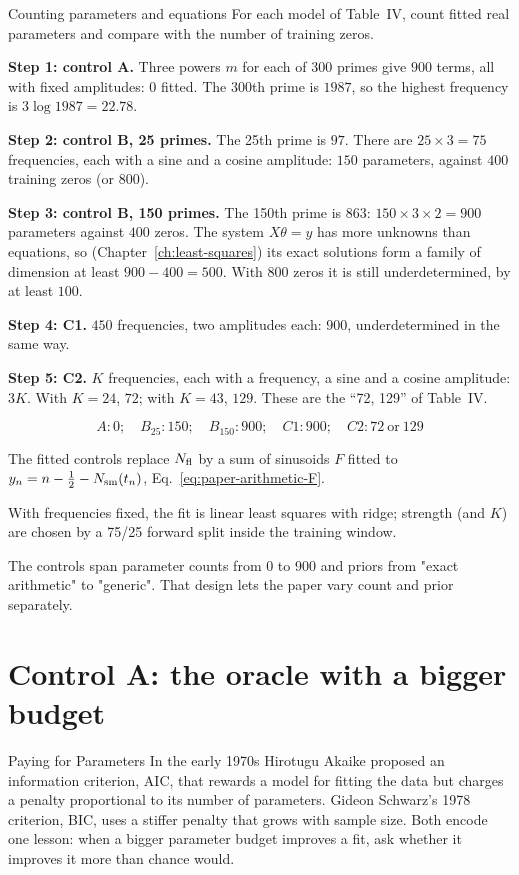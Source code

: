 \begin{sample}{Counting parameters and equations}
For each model of Table~IV, count fitted real parameters and compare with the number of training zeros.

\textbf{Step 1: control A.} Three powers $m$ for each of 300 primes give $900$ terms, all with fixed amplitudes: $0$ fitted. The 300th prime is $1987$, so the highest frequency is $3\log1987=22.78$.

\textbf{Step 2: control B, 25 primes.} The 25th prime is $97$. There are $25\times3=75$ frequencies, each with a sine and a cosine amplitude: $150$ parameters, against $400$ training zeros (or $800$).

\textbf{Step 3: control B, 150 primes.} The 150th prime is $863$: $150\times3\times2=900$ parameters against $400$ zeros. The system $X\theta=y$ has more unknowns than equations, so (Chapter~\ref{ch:least-squares}) its exact solutions form a family of dimension at least $900-400=500$. With $800$ zeros it is still underdetermined, by at least $100$.

\textbf{Step 4: C1.} $450$ frequencies, two amplitudes each: $900$, underdetermined in the same way.

\textbf{Step 5: C2.} $K$ frequencies, each with a frequency, a sine and a cosine amplitude: $3K$. With $K=24$, $72$; with $K=43$, $129$. These are the ``72, 129'' of Table~IV.

\[
\boxed{A:0;\quad B_{25}:150;\quad B_{150}:900;\quad C1:900;\quad C2:72\ \text{or}\ 129}
\]
\end{sample}

\begin{keyideas}
\item The fitted controls replace $N_{\mathrm{fl}}$ by a sum of sinusoids $F$ fitted to $y_n=n-\tfrac12-N_{\mathrm{sm}}(t_n)$, Eq.~\eqref{eq:paper-arithmetic-F}.
\item With frequencies fixed, the fit is linear least squares with ridge; strength (and $K$) are chosen by a 75/25 forward split inside the training window.
\item The controls span parameter counts from 0 to 900 and priors from "exact arithmetic" to "generic". That design lets the paper vary count and prior separately.
\end{keyideas}

\section{Control A: the oracle with a bigger budget}\label{sec:paper-arithmetic-A}
\begin{didyouknow}{Paying for Parameters}
In the early 1970s Hirotugu Akaike proposed an information criterion, AIC, that rewards a model for fitting the data but charges a penalty proportional to its number of parameters. Gideon Schwarz's 1978 criterion, BIC, uses a stiffer penalty that grows with sample size. Both encode one lesson: when a bigger parameter budget improves a fit, ask whether it improves it more than chance would.
\end{didyouknow}

